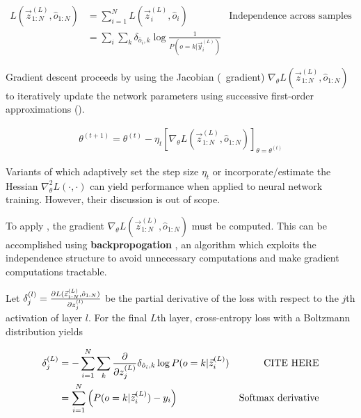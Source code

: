 \begin{align}
    L(\vec{z}^{(L)}_{1:N}, \hat{o}_{1:N})
    &= \sum_{i=1}^{N} L(\vec{z}^{(L)}_i, \hat{o}_i) &\text{Independence across samples} \nonumber\\
    &= \sum_i \sum_k \delta_{\hat{o}_i,k} \log \frac{1}{P(o=k | \vec{y}_i^{(L)})} & \label{eq:cross-entropy-loss}
\end{align}

Gradient descent proceeds by using the Jacobian (\ie\ gradient) $\nabla_\theta
L(\vec{z}^{(L)}_{1:N}, \hat{o}_{1:N})$ to iteratively update the network
parameters using successive first-order approximations ().

\begin{align}
    \label{eq:nn-training-iteration-scheme}
    \theta^{(t+1)} = \theta^{(t)}
    - \eta_t \left[ \nabla_\theta L(\vec{z}^{(L)}_{1:N}, \hat{o}_{1:N}) \right]_{\theta = \theta^{(t)}}
\end{align}

Variants of  which adaptively set the
step size $\eta_t$ or incorporate/estimate the Hessian $\nabla^2_{\theta}
L(\cdot, \cdot)$ can yield performance when applied to neural network training.
However, their discussion is out of scope. 

To apply , the gradient $\nabla_\theta
L(\vec{z}^{(L)}_{1:N}, \hat{o}_{1:N})$ must be computed. This can be
accomplished using \textbf{backpropogation} , an algorithm which
exploits the independence structure to avoid unnecessary computations and make
gradient computations tractable.

Let $\delta^{(l)}_{j} = \frac{\partial L(\vec{z}^{(L)}_{1:N}, \hat{o}_{1:N})}{\partial
z^{(l)}_j}$ be the partial derivative of the loss with respect to the $j$th
activation of layer $l$. For the final $L$th layer, cross-entropy loss
with a Boltzmann distribution yields

\begin{align*}
    \delta^{(L)}_{j}
    &= - \sum_{i=1}^{N} \sum_{k} \frac{\partial}{\partial z^{(L)}_j} \delta_{\hat{o}_i,k} \log P(o=k | \vec{z}^{(L)}_i ) &\text{CITE HERE} \\
    &= \sum_{i=1}^{N} \left( P(o=k | \vec{z}^{(L)}_i ) - y_i \right) & \text{Softmax derivative}
\end{align*}

